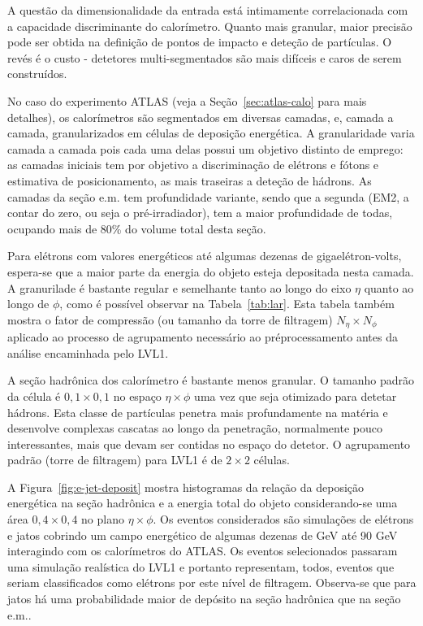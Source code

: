 A questão da dimensionalidade da entrada está intimamente correlacionada com a
capacidade discriminante do calorímetro. Quanto mais granular, maior precisão
pode ser obtida na definição de pontos de impacto e deteção de partículas. O
revés é o custo - detetores multi-segmentados são mais difíceis e caros de
serem construídos.

No caso do experimento ATLAS (veja a Seção~\ref{sec:atlas-calo} para mais
detalhes), os calorímetros são segmentados em diversas camadas, e, camada a
camada, granularizados em células de deposição energética. A granularidade
varia camada a camada pois cada uma delas possui um objetivo distinto de
emprego: as camadas iniciais tem por objetivo a discriminação de elétrons e
fótons e estimativa de posicionamento, as mais traseiras a deteção de
hádrons. As camadas da seção e.m. tem profundidade variante, sendo que a
segunda (EM2, a contar do zero, ou seja o pré-irradiador), tem a maior
profundidade de todas, ocupando mais de 80\% do volume total desta seção.

Para elétrons com valores energéticos até algumas dezenas de
gigaelétron-volts, espera-se que a maior parte da energia do objeto esteja
depositada nesta camada. A granurilade é bastante regular e semelhante tanto
ao longo do eixo $\eta$ quanto ao longo de $\phi$, como é possível observar na
Tabela~\ref{tab:lar}. Esta tabela também mostra o fator de compressão (ou
tamanho da torre de filtragem) $N_{\eta} \times N_{\phi}$ aplicado ao processo
de agrupamento necessário ao préprocessamento antes da análise encaminhada
pelo LVL1.

A seção hadrônica dos calorímetro é bastante menos granular. O tamanho padrão
da célula é $0,1\times0,1$ no espaço $\eta\times\phi$ uma vez que seja
otimizado para detetar hádrons. Esta classe de partículas penetra mais
profundamente na matéria e desenvolve complexas cascatas ao longo da
penetração, normalmente pouco interessantes, mais que devam ser contidas no
espaço do detetor. O agrupamento padrão (torre de filtragem) para LVL1 é de
$2\times2$ células.

A Figura~\ref{fig:e-jet-deposit} mostra histogramas da relação da deposição
energética na seção hadrônica e a energia total do objeto considerando-se uma
área $0,4\times0,4$ no plano $\eta\times\phi$. Os eventos considerados são
simulações de elétrons e jatos cobrindo um campo energético de algumas dezenas
de GeV até 90 GeV interagindo com os calorímetros do ATLAS. Os eventos
selecionados passaram uma simulação realística do LVL1 e portanto representam,
todos, eventos que seriam classificados como elétrons por este nível de
filtragem. Observa-se que para jatos há uma probabilidade maior de depósito na
seção hadrônica que na seção e.m..

